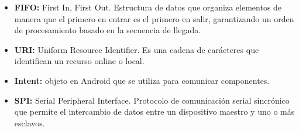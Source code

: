 \begin{itemize}
    \item \textbf{FIFO:} First In, First Out. Estructura de datos que organiza elementos de manera que el primero en entrar es el primero en salir, garantizando un orden de procesamiento basado en la secuencia de llegada.
    \item \textbf{URI:} Uniform Resource Identifier. Es una cadena de carácteres que identifican un recurso online o local.
    \item \textbf{Intent:} objeto en Android que se utiliza para comunicar componentes.
    \item \textbf{SPI:} Serial Peripheral Interface. Protocolo de comunicación serial sincrónico que permite el intercambio de datos entre un dispositivo maestro y uno o más esclavos.
\end{itemize}

\cleardoublepage